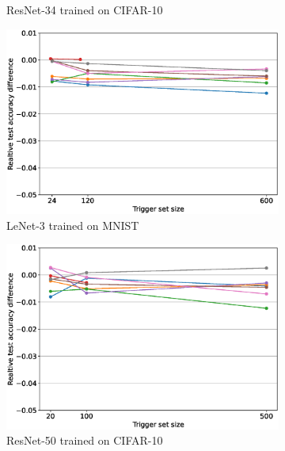 \begin{figure}
\begin{subfigure}{0.4\linewidth}
        \caption{ResNet-34 trained on CIFAR-10}
        \label{fig:fidelity-resnet34}
    \end{subfigure}
    \quad
    \begin{subfigure}{0.4\linewidth}
        \includegraphics[width=\linewidth]{images/fidelity/lenet3_fidelity_rel_per_arch.eps}
        \caption{LeNet-3 trained on MNIST}
        \label{fig:fidelity-lenet3}
    \end{subfigure}
    \quad
    \begin{subfigure}{0.4\linewidth}
        \includegraphics[width=\linewidth]{images/fidelity/resnet50_fidelity_rel_per_arch.eps}
        \caption{ResNet-50 trained on CIFAR-10}
        \label{fig:fidelity-resnet50}
    \end{subfigure}
    \quad
    \begin{subfigure}{0.4\linewidth}

\end{subfigure}
\end{figure}
